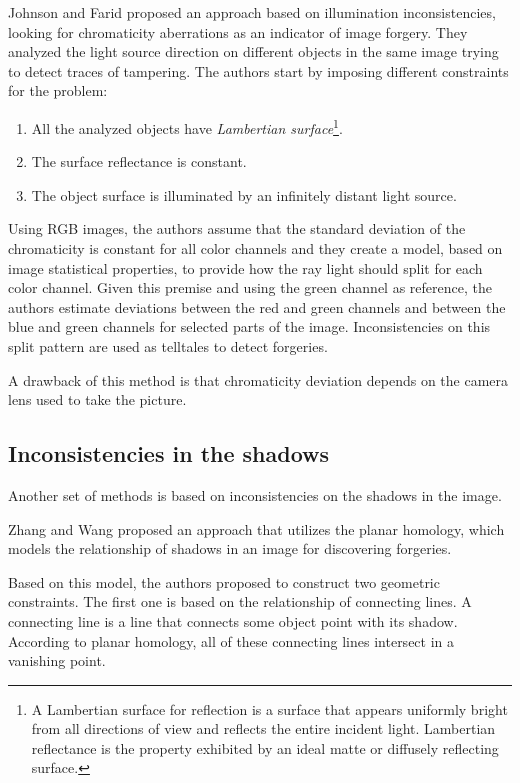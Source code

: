 Johnson and Farid\cite{Johnson:2005:EDF:1073170.1073171} proposed an approach based on illumination inconsistencies, looking for chromaticity aberrations as an indicator of image forgery. They analyzed the light source direction on different objects in the same image trying to detect traces of tampering. The authors start by imposing different constraints for the problem:

\begin{enumerate}
\item All the analyzed objects have \emph{Lambertian surface}\footnote{A Lambertian surface for reflection is a surface that appears uniformly bright from all directions of view and reflects the entire incident light. Lambertian reflectance is the property exhibited by an ideal matte or diffusely reflecting surface.}\cite{mazin2015estimation}.
\item The surface reflectance is constant.
\item The object surface is illuminated by an infinitely distant light source.
\end{enumerate}

Using RGB images, the authors assume that the standard deviation of the chromaticity is constant  for all color channels and they create a model, based on image statistical properties, to provide how the ray light should split for each color channel. Given this premise and using the green channel as reference, the authors estimate deviations between the red and green channels and between the blue and green channels for selected parts of the image. Inconsistencies on this split pattern are used as telltales to detect forgeries. 

A drawback of this method is that chromaticity deviation depends on the camera lens used to take the picture. 

\subsection{Inconsistencies in the shadows}

Another set of methods is based on inconsistencies on the shadows in the image.
 
Zhang and Wang \cite{zhang2009detecting} proposed an approach that utilizes the planar homology\cite{springer1964geometry}, which models the relationship of shadows in an image for discovering forgeries.

Based on this model, the authors proposed to construct two geometric constraints. The first one is based on the relationship of connecting lines. A connecting line is a line that connects some object point with its shadow. According to planar homology, all of these connecting lines intersect in a vanishing point. 

